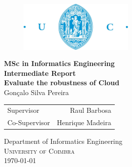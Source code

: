 \begin{titlepage}

\begin{center}

\begin{figure}[!ht]
\begin{center}
\includegraphics[width=0.5\textwidth]{img/uc.jpg}
\end{center}
\end{figure}
\vspace{0.9cm}

\small{\bf MSc in Informatics Engineering}\\[0.3in]
\small{\bf Intermediate Report}\\[0.7in]

\Large
\textbf{Evaluate the robustness of Cloud}\\[0.9in]

\Large{Gonçalo Silva Pereira}\\
\vspace{0.5cm}

\normalsize
\begin{table}[h]
\centering
\begin{tabular}{lr}\hline
Supervisor     &  Raul Barbosa\\
Co-Supervisor  &  Henrique Madeira\\ \hline
\end{tabular}
\end{table}

\vspace{3cm}
\Large{Department of Informatics Engineering}\\
\normalsize
\textsc{University of Coimbra}
\vspace{0.2cm}\\


\dateenglish
\today


\end{center}
\end{titlepage}

